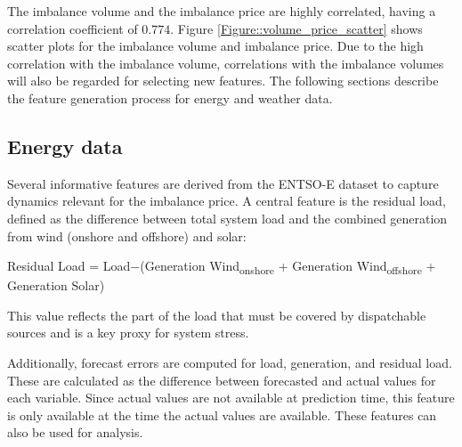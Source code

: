 \documentclass[class=scrbook, crop=false]{standalone}
\begin{document}



The imbalance volume and the imbalance price are highly correlated, having a correlation coefficient of $0.774$. 
Figure \ref{Figure::volume_price_scatter} shows scatter plots for the imbalance volume and imbalance price.
Due to the high correlation with the imbalance volume, correlations with the imbalance volumes will also be regarded for selecting new features.
The following sections describe the feature generation process for energy and weather data.


    \subsection{Energy data}
    \label{Section::FE_Energy_Data}

Several informative features are derived from the ENTSO-E dataset to capture dynamics relevant for the imbalance price. A central feature is the residual load, defined as the difference between total system load and the combined generation from wind (onshore and offshore) and solar:

Residual Load = Load−(Generation Wind\textsubscript{onshore} + Generation Wind\textsubscript{offshore} + Generation Solar)

This value reflects the part of the load that must be covered by dispatchable sources and is a key proxy for system stress.

Additionally, forecast errors are computed for load, generation, and residual load. These are calculated as the difference between forecasted and actual values for each variable. Since actual values are not available at prediction time, this feature is only available at the time the actual values are available. These features can also be used for analysis. 
\end{document}
